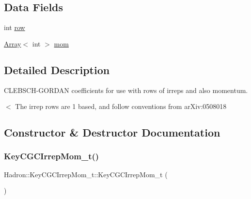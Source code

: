 \subsection*{Data Fields}
\begin{DoxyCompactItemize}
\item 
int \mbox{\hyperlink{structHadron_1_1KeyCGCIrrepMom__t_a3e57507b9b7e870a9def2e18f4507875}{row}}
\item 
\mbox{\hyperlink{classXMLArray_1_1Array}{Array}}$<$ int $>$ \mbox{\hyperlink{structHadron_1_1KeyCGCIrrepMom__t_ac6136fa6ead6307922ff19950cacb083}{mom}}
\end{DoxyCompactItemize}


\subsection{Detailed Description}
C\+L\+E\+B\+S\+C\+H-\/\+G\+O\+R\+D\+AN coefficients for use with rows of irreps and also momentum. 

$<$ The irrep rows are 1 based, and follow conventions from ar\+Xiv\+:0508018 

\subsection{Constructor \& Destructor Documentation}
\mbox{\label{structHadron_1_1KeyCGCIrrepMom__t_aa3965e02d80a6c483de3e253a4de7826}} 
\subsubsection{\texorpdfstring{KeyCGCIrrepMom\_t()}{KeyCGCIrrepMom\_t()}\hspace{0.1cm}{\footnotesize\ttfamily [1/6]}}
{\footnotesize\ttfamily Hadron\+::\+Key\+C\+G\+C\+Irrep\+Mom\+\_\+t\+::\+Key\+C\+G\+C\+Irrep\+Mom\+\_\+t (\begin{DoxyParamCaption}{ }\end{DoxyParamCaption})\hspace{0.3cm}{\ttfamily [inline]}}

\mbox{\label{structHadron_1_1KeyCGCIrrepMom__t_a467e3ce4ab08bc6438ac855240bead31}} 
